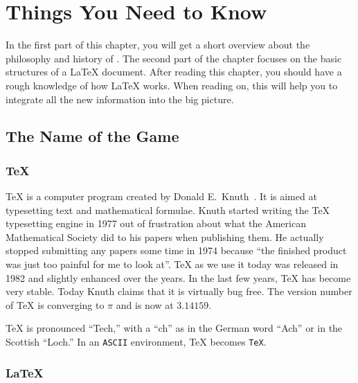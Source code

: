  
\chapter{Things You Need to Know}
\begin{intro}
In the first part of this chapter, you will get a short 
overview about the philosophy and history of \LaTeXe. The second part
of the chapter focuses on the basic structures of a \LaTeX{} document. 
After reading this chapter, you should have a rough knowledge
of how \LaTeX{} works. When reading on, this will help you to integrate
all the new information into the big picture.  
\end{intro}

\section{The Name of the Game}
\subsection{\TeX}
 
\TeX{} is a computer program created by Donald
E.~Knuth~\cite{texbook}.  It is aimed at typesetting text and
mathematical formulae. Knuth started writing the \TeX{} typesetting
engine in 1977 out of frustration about what the American Mathematical
Society did to his papers when publishing them. He actually stopped
submitting any papers some time in 1974 because ``the finished product
was just too painful for me to look at''. \TeX{} as we use it today
was released in 1982 and slightly enhanced over the years. In the last
few years, \TeX{} has become very stable. Today Knuth claims that it is
virtually bug free. The version number of \TeX{} is converging to $\pi$
and is now at $3.14159$.


\TeX{} is pronounced ``Tech,'' with a ``ch'' as in the German word
``Ach'' or in the Scottish ``Loch.'' In an \texttt{ASCII} environment, \TeX{}
becomes \texttt{TeX}.

\subsection{\LaTeX}
 
